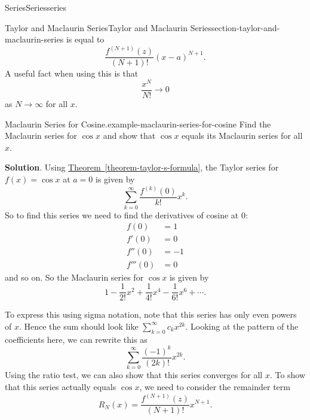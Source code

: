 \documentclass[oneside,10pt,]{book}
\numberwithin{equation}{section}
\newcommand{\amp}{&}
\begin{document}
\begin{chapterptx}{Series}{}{Series}{}{}{series}
\begin{sectionptx}{Taylor and Maclaurin Series}{}{Taylor and Maclaurin Series}{}{}{section-taylor-and-maclaurin-series}
is equal to%
\begin{equation*}
\frac{f^{(N+1)}(z)}{(N+1)!}(x - a)^{N+1}\text{.}
\end{equation*}
A useful fact when using this is that%
\begin{equation*}
\frac{x^{N}}{N!}\to0
\end{equation*}
as \(N\to\infty\) for all \(x\).%
\begin{example}{Maclaurin Series for Cosine.}{example-maclaurin-series-for-cosine}%
\hypertarget{p-971}{}%
Find the Maclaurin series for \(\cos x\) and show that \(\cos x\) equals its Maclaurin series for all \(x\).%
\par\smallskip%
\noindent\textbf{Solution}.\hypertarget{solution-197}{}\quad%
\hypertarget{p-972}{}%
Using \hyperref[theorem-taylor-s-formula]{Theorem~\ref{theorem-taylor-s-formula}}, the Taylor series for \(f(x) = \cos x\) at \(a = 0\) is given by%
\begin{equation*}
\sum_{k=0}^{\infty}\frac{f^{(k)}(0)}{k!}x^{k}\text{.}
\end{equation*}
So to find this series we need to find the derivatives of cosine at \(0\):%
\begin{align*}
f(0) \amp = 1 \\
f'(0) \amp = 0 \\
f''(0) \amp = -1 \\
f'''(0) \amp = 0 
\end{align*}
and so on. So the Maclaurin series for \(\cos x\) is given by%
\begin{equation*}
1 - \frac{1}{2!}x^{2} + \frac{1}{4!}x^{4} - \frac{1}{6!}x^{6} + \cdots\text{.}
\end{equation*}
%
\par
\hypertarget{p-973}{}%
To express this using sigma notation, note that this series has only even powers of \(x\). Hence the sum should look like \(\sum_{k=0}^{\infty}c_{k}x^{2k}\). Looking at the pattern of the coefficients here, we can rewrite this as%
\begin{equation*}
\sum_{k=0}^{\infty}\frac{(-1)^{k}}{(2k)!}x^{2k}\text{.}
\end{equation*}
Using the ratio test, we can also show that this series converges for all \(x\). To show that this series actually equals \(\cos x\), we need to consider the remainder term%
\begin{equation*}
R_{N}(x) = \frac{f^{(N+1)}(z)}{(N+1)!}x^{N+1}\text{.}
\end{equation*}
%
\par
\hypertarget{p-974}{}%

\end{example}
\end{sectionptx}
\end{chapterptx}
\end{document}
